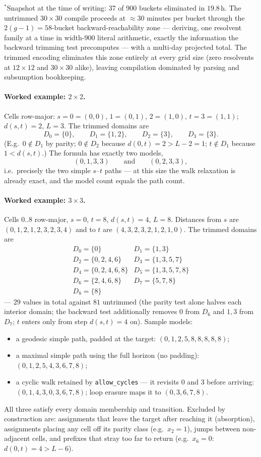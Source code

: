 \noindent
$^{*}$Snapshot at the time of writing: 37 of 900 buckets eliminated in
$19.8$\,h. The untrimmed $30\times 30$ compile proceeds at $\approx 30$
minutes per bucket through the $2(g{-}1)=58$-bucket backward-reachability
zone — deriving, one resolvent family at a time in width-$900$ literal
arithmetic, exactly the information the backward trimming test
precomputes — with a multi-day projected total. The trimmed encoding
eliminates this zone entirely at every grid size (zero resolvents at
$12\times 12$ and $30\times 30$ alike), leaving compilation dominated by
parsing and subsumption bookkeeping.

\paragraph{Worked example: $2\times 2$.}
Cells row-major: $s=0=(0,0)$, $1=(0,1)$, $2=(1,0)$, $t=3=(1,1)$;
$d(s,t)=2$, $L=3$. The trimmed domains are
\[
  D_0=\{0\},\qquad
  D_1=\{1,2\},\qquad
  D_2=\{3\},\qquad
  D_3=\{3\}.
\]
(E.g.\ $0\notin D_1$ by parity; $0\notin D_2$ because
$d(0,t)=2>L-2=1$; $t\notin D_1$ because $1<d(s,t)$.)
The formula has exactly two models,
\[
  (0,1,3,3) \qquad\text{and}\qquad (0,2,3,3),
\]
i.e.\ precisely the two simple $s$--$t$ paths — at this size the walk
relaxation is already exact, and the model count equals the path count.

\paragraph{Worked example: $3\times 3$.}
Cells $0..8$ row-major, $s=0$, $t=8$, $d(s,t)=4$, $L=8$. Distances from
$s$ are $(0,1,2,1,2,3,2,3,4)$ and to $t$ are $(4,3,2,3,2,1,2,1,0)$.
The trimmed domains are
\[
\begin{array}{ll}
  D_0=\{0\} &
  D_1=\{1,3\}\\
  D_2=\{0,2,4,6\} &
  D_3=\{1,3,5,7\}\\
  D_4=\{0,2,4,6,8\} &
  D_5=\{1,3,5,7,8\}\\
  D_6=\{2,4,6,8\} &
  D_7=\{5,7,8\}\\
  D_8=\{8\}
\end{array}
\]
— $29$ values in total against $81$ untrimmed (the parity test alone
halves each interior domain; the backward test additionally removes
$0$ from $D_6$ and $1,3$ from $D_7$; $t$ enters only from step
$d(s,t)=4$ on). Sample models:
\begin{itemize}
\item a geodesic simple path, padded at the target:
      $(0,1,2,5,8,8,8,8,8)$;
\item a maximal simple path using the full horizon (no padding):
      $(0,1,2,5,4,3,6,7,8)$;
\item a cyclic walk retained by \texttt{allow\_cycles} — it revisits
      $0$ and $3$ before arriving:
      $(0,1,4,3,0,3,6,7,8)$; loop erasure maps it to $(0,3,6,7,8)$.
\end{itemize}
All three satisfy every domain membership and transition. Excluded by
construction are: assignments that leave the target after reaching it
(absorption), assignments placing any cell off its parity class (e.g.\
$x_2=1$), jumps between non-adjacent cells, and prefixes that stray too
far to return (e.g.\ $x_6=0$: $d(0,t)=4>L-6$).

